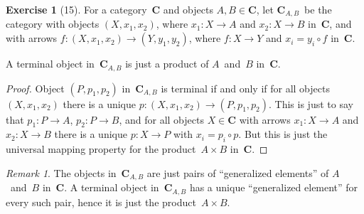\documentclass[letterpaper,12pt]{article}
\newcommand{\after}{\circ}
\newcommand{\cat}[1]{\mathbf{#1}}
\newcommand{\C}{\cat{C}}
\theoremstyle{definition}
\newtheorem*{exer}{Exercise}
\theoremstyle{remark}
\newtheorem*{rmk}{Remark}
\theoremstyle{direction}
\begin{document}
\begin{exer}[15]
For a category~\(\C\) and objects \(A,B\in\C\), let \(\C_{A,B}\)~be the category with objects \((X,x_1,x_2)\), where \(x_1:X\to A\) and \(x_2:X\to B\) in~\(\C\), and with arrows \(f:(X,x_1,x_2)\to(Y,y_1,y_2)\), where \(f:X\to Y\) and \(x_i=y_i\after f\) in~\(\C\).

A terminal object in~\(\C_{A,B}\) is just a product of \(A\)~and~\(B\) in~\(\C\).
\end{exer}
\begin{proof}
Object \((P,p_1,p_2)\) in~\(\C_{A,B}\) is terminal if and only if for all objects \((X,x_1,x_2)\) there is a unique \(p:(X,x_1,x_2)\to(P,p_1,p_2)\). This is just to say that \(p_1:P\to A\), \(p_2:P\to B\), and for all objects \(X\in\C\) with arrows \(x_1:X\to A\) and \(x_2:X\to B\) there is a unique \(p:X\to P\) with \(x_i=p_i\after p\). But this is just the universal mapping property for the product~\(A\times B\) in~\(\C\).
\end{proof}
\begin{rmk}
The objects in~\(\C_{A,B}\) are just pairs of ``generalized elements'' of \(A\)~and~\(B\) in~\(\C\). A terminal object in~\(\C_{A,B}\) has a unique ``generalized element'' for every such pair, hence it is just the product~\(A\times B\).
\end{rmk}
\end{document}
